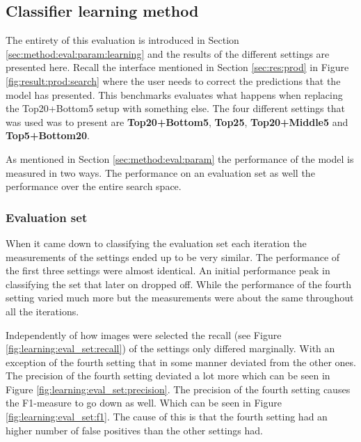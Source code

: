 
\subsection{Classifier learning method}
\label{sec:res:learning}

The entirety of this evaluation is introduced in Section \ref{sec:method:eval:param:learning} and the results of the different settings are presented here. 
Recall the interface mentioned in Section \ref{sec:res:prod} in Figure \ref{fig:result:prod:search} where the user needs to correct the predictions that the model has presented. This benchmarks evaluates what happens when replacing the Top20+Bottom5 setup with something else. The four different settings that was used was to present are \textbf{Top20+Bottom5}, \textbf{Top25}, \textbf{Top20+Middle5} and \textbf{Top5+Bottom20}.

As mentioned in Section \ref{sec:method:eval:param} the performance of the model is measured in two ways. The performance on an evaluation set as well the performance over the entire search space.

\subsubsection{Evaluation set}
\label{sec:res:learning:eval}
When it came down to classifying the evaluation set each iteration the measurements of the settings ended up to be very similar. The performance of the first three settings were almost identical. An initial performance peak in classifying the set that later on dropped off. While the performance of the fourth setting varied much more but the measurements were about the same throughout all the iterations.

Independently of how images were selected the recall (see Figure \ref{fig:learning:eval_set:recall}) of the settings only differed marginally. With an exception of the fourth setting that in some manner deviated from the other ones. 
The precision of the fourth setting deviated a lot more which can be seen in Figure \ref{fig:learning:eval_set:precision}. The precision of the fourth setting causes the F1-measure to go down as well. Which can be seen in Figure \ref{fig:learning:eval_set:f1}. The cause of this is that the fourth setting had an higher number of false positives than the other settings had.

